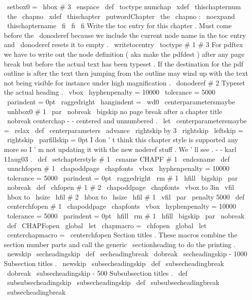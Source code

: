 {{{{\
setbox0
=
\
hbox
{
#
3
\
enspace
}
%
\
def
\
toctype
{
numchap
}
%
\
xdef
\
thischapternum
{
\
the
\
chapno
}
%
\
xdef
\
thischapter
{
\
putwordChapter
{
}
\
the
\
chapno
:
\
noexpand
\
thischaptername
}
%
\
fi
\
fi
\
fi
%
%
Write
the
toc
entry
for
this
chapter
.
Must
come
before
the
%
\
donoderef
because
we
include
the
current
node
name
in
the
toc
%
entry
and
\
donoderef
resets
it
to
empty
.
\
writetocentry
{
\
toctype
}
{
#
1
}
{
#
3
}
%
%
%
For
pdftex
we
have
to
write
out
the
node
definition
(
aka
make
%
the
pdfdest
)
after
any
page
break
but
before
the
actual
text
has
%
been
typeset
.
If
the
destination
for
the
pdf
outline
is
after
the
%
text
then
jumping
from
the
outline
may
wind
up
with
the
text
not
%
being
visible
for
instance
under
high
magnification
.
\
donoderef
{
#
2
}
%
%
%
Typeset
the
actual
heading
.
\
vbox
{
\
hyphenpenalty
=
10000
\
tolerance
=
5000
\
parindent
=
0pt
\
raggedright
\
hangindent
=
\
wd0
\
centerparametersmaybe
\
unhbox0
#
1
\
par
}
%
}
%
\
nobreak
\
bigskip
%
no
page
break
after
a
chapter
title
\
nobreak
}
%
centerchap
-
-
centered
and
unnumbered
.
\
let
\
centerparametersmaybe
=
\
relax
\
def
\
centerparameters
{
%
\
advance
\
rightskip
by
3
\
rightskip
\
leftskip
=
\
rightskip
\
parfillskip
=
0pt
}
%
I
don
'
t
think
this
chapter
style
is
supported
any
more
so
I
'
m
not
%
updating
it
with
the
new
noderef
stuff
.
We
'
ll
see
.
-
-
karl
11aug03
.
%
\
def
\
setchapterstyle
#
1
{
\
csname
CHAPF
#
1
\
endcsname
}
%
\
def
\
unnchfopen
#
1
{
%
\
chapoddpage
{
\
chapfonts
\
vbox
{
\
hyphenpenalty
=
10000
\
tolerance
=
5000
\
parindent
=
0pt
\
raggedright
\
rm
#
1
\
hfill
}
}
\
bigskip
\
par
\
nobreak
}
\
def
\
chfopen
#
1
#
2
{
\
chapoddpage
{
\
chapfonts
\
vbox
to
3in
{
\
vfil
\
hbox
to
\
hsize
{
\
hfil
#
2
}
\
hbox
to
\
hsize
{
\
hfil
#
1
}
\
vfil
}
}
%
\
par
\
penalty
5000
%
}
\
def
\
centerchfopen
#
1
{
%
\
chapoddpage
{
\
chapfonts
\
vbox
{
\
hyphenpenalty
=
10000
\
tolerance
=
5000
\
parindent
=
0pt
\
hfill
{
\
rm
#
1
}
\
hfill
}
}
\
bigskip
\
par
\
nobreak
}
\
def
\
CHAPFopen
{
%
\
global
\
let
\
chapmacro
=
\
chfopen
\
global
\
let
\
centerchapmacro
=
\
centerchfopen
}
%
Section
titles
.
These
macros
combine
the
section
number
parts
and
%
call
the
generic
\
sectionheading
to
do
the
printing
.
%
\
newskip
\
secheadingskip
\
def
\
secheadingbreak
{
\
dobreak
\
secheadingskip
{
-
1000
}
}
%
Subsection
titles
.
\
newskip
\
subsecheadingskip
\
def
\
subsecheadingbreak
{
\
dobreak
\
subsecheadingskip
{
-
500
}
}
%
Subsubsection
titles
.
\
def
\
subsubsecheadingskip
{
\
subsecheadingskip
}
\
def
\
subsubsecheadingbreak
{
\
subsecheadingbreak
}}}
